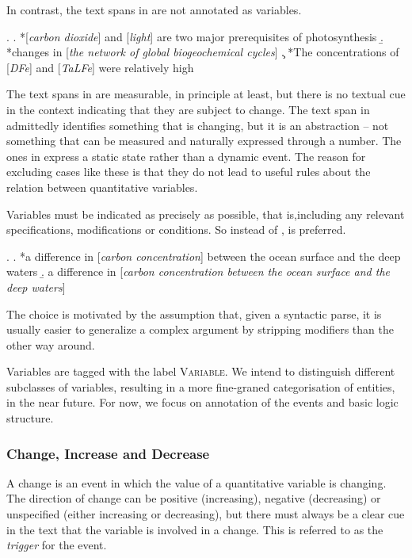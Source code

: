\documentclass[10pt, a4paper]{article}
\newcommand{\tag}[1]{\textsc{#1}}
\begin{document}
In contrast, the text spans in \Next are not annotated as variables.

\ex.
  \a. *[\emph{carbon dioxide}] and [\emph{light}] are two major prerequisites of photosynthesis
  \b. *changes in [\emph{the network of global biogeochemical cycles}] 
  \c. *The concentrations of [\emph{DFe}] and [\emph{TaLFe}] were relatively high

The text spans in \Last[a] are measurable, in principle at least, but there is no textual cue in the context indicating that they are subject to change. 
The text span in \Last[b] admittedly identifies something that is changing, but it is an abstraction -- not something that can be measured and naturally expressed through a number. 
The ones in \Last[c] express a static state rather than a dynamic event.
The reason for excluding cases like these is that they do not lead to useful rules about the relation between quantitative variables.

Variables must be indicated as precisely as possible, that is,including any relevant specifications, modifications or conditions. So instead of \Next[a], \Next[b] is preferred.

\ex.
  \a. *a difference in [\emph{carbon concentration}] between the ocean surface and the deep waters
  \b. a difference in [\emph{carbon concentration between the ocean surface and the deep waters}]

The choice is motivated by the assumption that, given a syntactic parse, it is usually easier to generalize a complex argument by stripping modifiers than the other way around.  

Variables are tagged with the label \tag{Variable}. 
We intend to distinguish different subclasses of variables, resulting in a more fine-graned categorisation of entities, in the near future.
For now, we focus on annotation of the events and basic logic structure. 


\subsubsection{Change, Increase and Decrease}

A change is an event in which the value of a quantitative variable is changing.
The direction of change can be positive (increasing), negative (decreasing) or unspecified (either increasing or decreasing), but there must always be a clear cue in the text that the variable is involved in a change.
This is referred to as the \emph{trigger} for the event.
\end{document}
